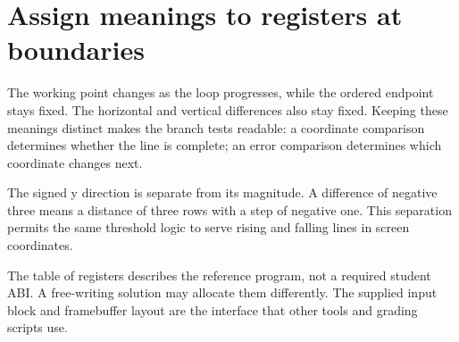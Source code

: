 \section{Assign meanings to registers at
  boundaries}\label{007-bresenham-line-p03-assign-meanings-to-registers-at-boundaries}

The working point changes as the loop progresses, while the ordered
endpoint stays fixed. The horizontal and vertical differences also stay
fixed. Keeping these meanings distinct makes the branch tests readable:
a coordinate comparison determines whether the line is complete; an
error comparison determines which coordinate changes next.

The signed y direction is separate from its magnitude. A difference of
negative three means a distance of three rows with a step of negative
one. This separation permits the same threshold logic to serve rising
and falling lines in screen coordinates.

The table of registers describes the reference program, not a required
student ABI. A free-writing solution may allocate them differently. The
supplied input block and framebuffer layout are the interface that other
tools and grading scripts use.

